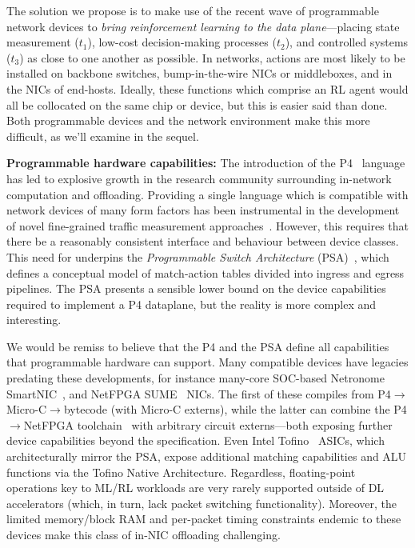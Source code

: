 \documentclass[sigconf,natbib=false]{acmart}
\newcommand{\fakepara}[1]{\noindent\textbf{#1:}}
\begin{document}
The solution we propose is to make use of the recent wave of programmable network devices to \emph{bring reinforcement learning to the data plane}---placing state measurement ($t_1$), low-cost decision-making processes ($t_2$), and controlled systems ($t_3$) as close to one another as possible.
In networks, actions are most likely to be installed on backbone switches, bump-in-the-wire NICs or middleboxes, and in the NICs of end-hosts.
Ideally, these functions which comprise an RL agent would all be collocated on the same chip or device, but this is easier said than done. 
Both programmable devices and the network environment make this more difficult, as we'll examine in the sequel.

\fakepara{Programmable hardware capabilities}
The introduction of the P4~\parencite{DBLP:journals/ccr/BosshartDGIMRSTVVW14} language has led to explosive growth in the research community surrounding in-network computation and offloading.
Providing a single language which is compatible with network devices of many form factors has been instrumental in the development of novel fine-grained traffic measurement approaches~\parencite{DBLP:conf/sigcomm/GuptaHCFRW18,DBLP:conf/sigcomm/ChenFKRR18,DBLP:conf/sosr/GhasemiBR17}.
However, this requires that there be a reasonably consistent interface and behaviour between device classes.
This need for underpins the \emph{Programmable Switch Architecture} (PSA)~\parencite{p4-psa}, which defines a conceptual model of match-action tables divided into ingress and egress pipelines.
The PSA presents a sensible lower bound on the device capabilities required to implement a P4 dataplane, but the reality is more complex and interesting.

We would be remiss to believe that the P4 and the PSA define all capabilities that programmable hardware can support.
Many compatible devices have legacies predating these developments, for instance many-core SOC-based Netronome SmartNIC~\parencite{netronome-smartnic}, and NetFPGA SUME~\parencite{DBLP:journals/micro/ZilbermanACM14} NICs.
The first of these compiles from P4$\rightarrow$Micro-C$\rightarrow$bytecode (with Micro-C externs), while the latter can combine the P4$\rightarrow$NetFPGA toolchain~\parencite{DBLP:conf/fpga/IbanezBMZ19} with arbitrary circuit externs---both exposing further device capabilities beyond the specification.
Even Intel Tofino~\parencite{barefoot-intel} ASICs, which architecturally mirror the PSA, expose additional matching capabilities and ALU functions via the Tofino Native Architecture.
Regardless, floating-point operations key to ML/RL workloads are very rarely supported outside of DL accelerators (which, in turn, lack packet switching functionality).
Moreover, the limited memory/block RAM and per-packet timing constraints endemic to these devices make this class of in-NIC offloading challenging.
\end{document}
